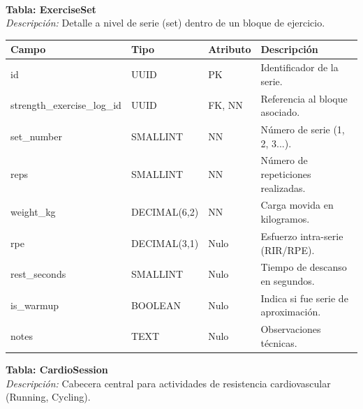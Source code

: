 \documentclass[12pt]{article}
\begin{document}
\\
\noindent\textbf{Tabla: ExerciseSet} \\
\textit{Descripción:} Detalle a nivel de serie (set) dentro de un bloque de ejercicio.
\begin{table}[h!]
    \centering
    \renewcommand{\arraystretch}{1.2}
    \small
    \begin{tabular}{|p{3.7cm}|p{2.5cm}|p{2cm}|p{6.5cm}|}
        \hline
        \rowcolor[HTML]{EFEFEF}
        \textbf{Campo} & \textbf{Tipo} & \textbf{Atributo} & \textbf{Descripción} \\ \hline
        id & UUID & PK & Identificador de la serie. \\ \hline
        strength\_exercise\_log\_id & UUID & FK, NN & Referencia al bloque asociado. \\ \hline
        set\_number & SMALLINT & NN & Número de serie (1, 2, 3...). \\ \hline
        reps & SMALLINT & NN & Número de repeticiones realizadas. \\ \hline
        weight\_kg & DECIMAL(6,2) & NN & Carga movida en kilogramos. \\ \hline
        rpe & DECIMAL(3,1) & Nulo & Esfuerzo intra-serie (RIR/RPE). \\ \hline
        rest\_seconds & SMALLINT & Nulo & Tiempo de descanso en segundos. \\ \hline
        is\_warmup & BOOLEAN & Nulo & Indica si fue serie de aproximación. \\ \hline
        notes & TEXT & Nulo & Observaciones técnicas. \\ \hline
    \end{tabular}
\end{table}
\newpage
\noindent\textbf{Tabla: CardioSession} \\
\textit{Descripción:} Cabecera central para actividades de resistencia cardiovascular (Running, Cycling).
\end{document}

